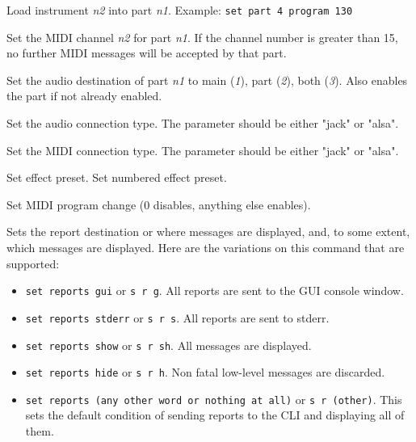       Load instrument \textsl{n2} into part \textsl{n1}.
      Example: \texttt{set part 4 program 130}

      Set the MIDI channel \textsl{n2} for part \textsl{n1}.
      If the channel number is greater than 15, no further MIDI
      messages will be accepted by that part.

      Set the audio destination of part \textsl{n1}
      to main (\textsl{1}), part (\textsl{2}), both (\textsl{3}).
      Also enables the part if not already enabled.

      Set the audio connection type.
      The parameter should be either "jack" or "alsa".

      Set the MIDI connection type.
      The parameter should be either "jack" or "alsa".

      Set effect preset.
      Set numbered effect preset.

      Set MIDI program change (0 disables, anything else enables).

      Sets the report destination or where messages are displayed, and, to
      some extent, which messages are displayed.  Here are the variations on
      this command that are supported:

      \begin{itemize}
         \item \texttt{set reports gui} or \texttt{s r g}.
            All reports are sent to the GUI console window.
         \item \texttt{set reports stderr} or \texttt{s r s}.
            All reports are sent to stderr.
         \item \texttt{set reports show} or \texttt{s r sh}.
            All messages are displayed.
         \item \texttt{set reports hide} or \texttt{s r h}.
            Non fatal low-level messages are discarded.
         \item \texttt{set reports (any other word or nothing at all)} or
            \texttt{s r (other)}.
            This sets the default condition of sending reports to the CLI and
            displaying all of them.
      \end{itemize}


